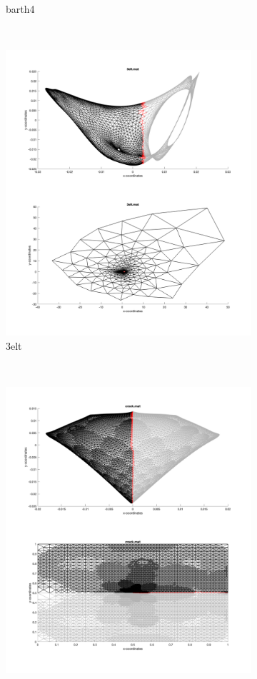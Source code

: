 \begin{figure}[H]
\begin{subfigure}{0.5\textwidth}
		\caption{barth4}
		\label{fig:coord_crack}
	\end{subfigure}\\
	\begin{subfigure}{0.5\textwidth}
		\includegraphics[width=\textwidth]{./media/3elt_eigen.png}
		\caption{3elt}
		\label{fig:metis_crack}
	\end{subfigure}%
	~
	\begin{subfigure}{0.5\textwidth}
		\includegraphics[width=\textwidth]{./media/crack_eigen.png}

\end{subfigure}
\end{figure}
